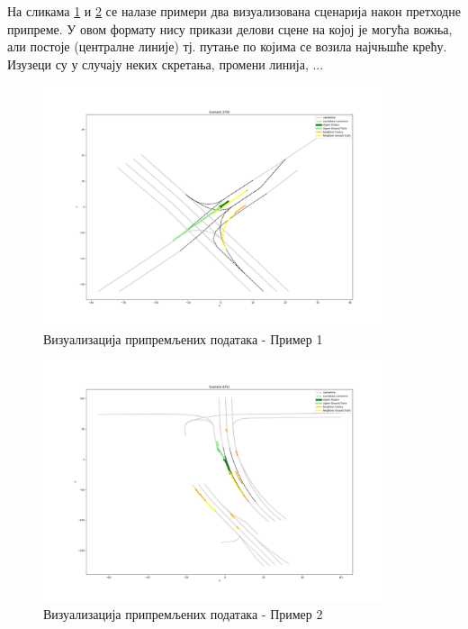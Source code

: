 \documentclass[11pt,oneside]{memoir}
\begin{document}
На сликама \ref{scenario-example-3700} и \ref{scenario-example-4791} се налазе примери два визуализована сценарија
након претходне припреме. У овом формату нису прикази делови сцене на којој је могућа вожња, али 
постоје (централне линије) тј. путање по којима се возила најчњшће крећу. Изузеци су у случају неких скретања,
промени линија, ...

\begin{figure}[h!]
  \includegraphics[width=0.9\textwidth]{images/scenario3700.png}
  \caption{Визуализација припремљених података - Пример 1}
  \label{scenario-example-3700}
\end{figure}

\begin{figure}[h!]
  \includegraphics[width=0.9\textwidth]{images/scenario4791.png}
  \caption{Визуализација припремљених података - Пример 2}
  \label{scenario-example-4791}
\end{figure}


\end{document}
